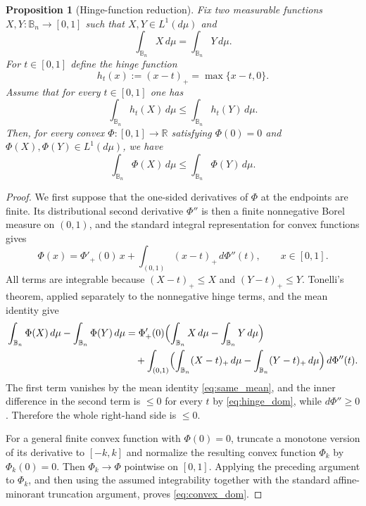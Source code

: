 \documentclass[11pt]{amsart}
\theoremstyle{plain}
\newtheorem{proposition}[theorem]{Proposition}
\theoremstyle{definition}
\theoremstyle{remark}
\newcommand{\B}{\mathbb{B}}
\newcommand{\R}{\mathbb{R}}
\begin{document}
\begin{proposition}[Hinge-function reduction]\label{prop:hinge_reduction}
Fix two measurable functions $X,Y:\B_n\to[0,1]$ such that $X,Y\in L^1(d\mu)$ and
\begin{equation}\label{eq:same_mean}
\int_{\B_n} X\,d\mu=\int_{\B_n} Y\,d\mu.
\end{equation}
For $t\in[0,1]$ define the \emph{hinge function}
\[
h_t(x):=(x-t)_+=\max\{x-t,0\}.
\]
Assume that for every $t\in[0,1]$ one has
\begin{equation}\label{eq:hinge_dom}
\int_{\B_n} h_t(X)\,d\mu \le \int_{\B_n} h_t(Y)\,d\mu.
\end{equation}
Then, for every convex $\Phi:[0,1]\to\R$ satisfying $\Phi(0)=0$ and
$\Phi(X),\Phi(Y)\in L^1(d\mu)$, we have
\begin{equation}\label{eq:convex_dom}
\int_{\B_n}\Phi(X)\,d\mu \le \int_{\B_n}\Phi(Y)\,d\mu.
\end{equation}
\end{proposition}

\begin{proof}
We first suppose that the one-sided derivatives of $\Phi$ at the endpoints
are finite. Its distributional second derivative $\Phi''$ is then a finite
nonnegative Borel measure on $(0,1)$, and the standard integral representation
for convex functions gives
\begin{equation}\label{eq:choquet}
\Phi(x)=\Phi'_+(0)\,x+\int_{(0,1)} (x-t)_+\,d\Phi''(t),
\qquad x\in[0,1].
\end{equation}
All terms are integrable because $(X-t)_+\le X$ and $(Y-t)_+\le Y$.
Tonelli's theorem, applied separately to the nonnegative hinge terms, and the
mean identity give
\begin{align*}
\int_{\B_n}\Phi(X)\,d\mu-\int_{\B_n}\Phi(Y)\,d\mu
&=
\Phi'_+(0)\Bigl(\int_{\B_n}X\,d\mu-\int_{\B_n}Y\,d\mu\Bigr)
\\
&\quad
+\int_{(0,1)}\Bigl(\int_{\B_n}(X-t)_+\,d\mu-\int_{\B_n}(Y-t)_+\,d\mu\Bigr)\,d\Phi''(t).
\end{align*}
The first term vanishes by the mean identity \eqref{eq:same_mean}, and the inner
difference in the second term is $\le0$ for every $t$ by \eqref{eq:hinge_dom},
while $d\Phi''\ge0$. Therefore the whole right-hand side is $\le0$.

For a general finite convex function with $\Phi(0)=0$, truncate a monotone
version of its derivative to $[-k,k]$ and normalize the resulting convex
function $\Phi_k$ by $\Phi_k(0)=0$. Then $\Phi_k\to\Phi$ pointwise on
$[0,1]$. Applying the preceding argument to $\Phi_k$, and then using the
assumed integrability together with the standard affine-minorant truncation
argument, proves \eqref{eq:convex_dom}.
\end{proof}
\end{document}
